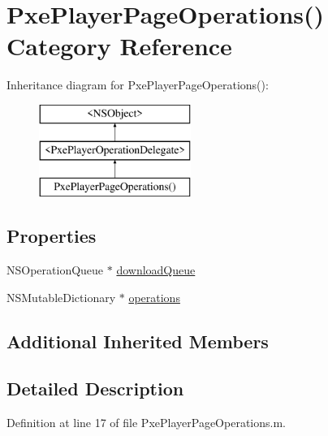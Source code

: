 \hypertarget{category_pxe_player_page_operations_07_08}{\section{Pxe\-Player\-Page\-Operations() Category Reference}
\label{category_pxe_player_page_operations_07_08}
}
Inheritance diagram for Pxe\-Player\-Page\-Operations()\-:\begin{figure}[H]
\begin{center}
\leavevmode
\includegraphics[height=3.000000cm]{category_pxe_player_page_operations_07_08}
\end{center}
\end{figure}
\subsection*{Properties}
\begin{DoxyCompactItemize}
\item 
N\-S\-Operation\-Queue $\ast$ \hyperlink{category_pxe_player_page_operations_07_08_a29883d3f799de7d14a2bfbb6f1404a29}{download\-Queue}
\item 
N\-S\-Mutable\-Dictionary $\ast$ \hyperlink{category_pxe_player_page_operations_07_08_aace2ae68fd45d3842ef28df4c9a4fef7}{operations}
\end{DoxyCompactItemize}
\subsection*{Additional Inherited Members}


\subsection{Detailed Description}


Definition at line 17 of file Pxe\-Player\-Page\-Operations.\-m.



